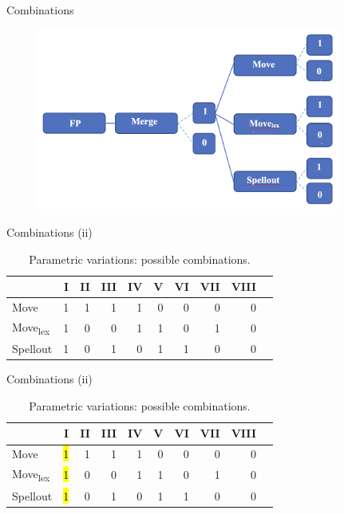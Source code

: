 \documentclass[lesson_slides]{subfiles}
\begin{document}
\begin{frame}{Combinations}

    \begin{center}
        \includegraphics[width=12cm, height=6cm]{images/combinations.png}
    \end{center}
    
\end{frame}
\begin{frame}{Combinations (ii)}

    \begin{table}[H]
        \centering
        \begin{tabular}{|l|r|r|r|r|r|r|r|r|r|}
        \hline
         & I & II & III & IV & V & VI & VII & VIII \\
        \hline
        Move                    & 1 & 1 & 1 & 1 & 0 & 0 & 0 & 0 \\
        \hline
        Move\textsubscript{lex} & 1 & 0 & 0 & 1 & 1 & 0 & 1 & 0 \\
        \hline
        Spellout                & 1 & 0 & 1 & 0 & 1 & 1 & 0 & 0 \\
        \hline
        \end{tabular}
        \caption{\label{tab:samp}Parametric variations: possible combinations.}
    \end{table}
    
\end{frame}
\begin{frame}{Combinations (ii)}

    \begin{table}[H]
        \centering
        \begin{tabular}{|l|r|r|r|r|r|r|r|r|r|}
        \hline
         & I & II & III & IV & V & VI & VII & VIII \\
        \hline
        Move                    & \hl{1} & 1 & 1 & 1 & 0 & 0 & 0 & 0 \\
        \hline
        Move\textsubscript{lex} & \hl{1} & 0 & 0 & 1 & 1 & 0 & 1 & 0 \\
        \hline
        Spellout                & \hl{1} & 0 & 1 & 0 & 1 & 1 & 0 & 0 \\
        \hline
        \end{tabular}
        \caption{\label{tab:samp}Parametric variations: possible combinations.}
    \end{table}
    
\end{frame}
\end{document}
